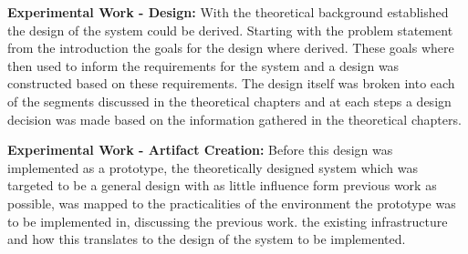
\textbf{Experimental Work - Design:} With the theoretical background established the design of the system could be derived.
Starting with the problem statement from the introduction the goals for the design where derived.
These goals where then used to inform the requirements for the system and a design was constructed based on these requirements.
The design itself was broken into each of the segments discussed in the theoretical chapters and at each steps
a design decision was made based on the information gathered in the theoretical chapters.




\textbf{Experimental Work - Artifact Creation:} Before this design was implemented as a prototype,
the theoretically designed system which was targeted to be a general design with as little influence form previous work as possible,
was mapped to the practicalities of the environment the prototype was to be implemented in, discussing the previous work.
the existing infrastructure and how this translates to the design of the system to be implemented.


